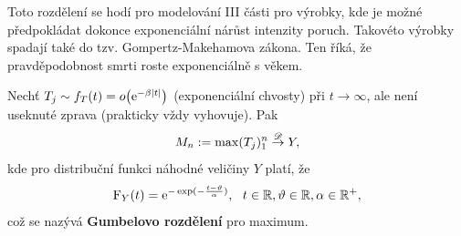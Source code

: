     Toto rozdělení se hodí pro modelování III části pro výrobky, kde je možné předpokládat dokonce exponenciální nárůst intenzity poruch. Takovéto výrobky spadají také do tzv. Gompertz-Makehamova zákona. Ten říká, že pravděpodobnost smrti roste exponenciálně s věkem.

    \begin{define}
        Nechť $T_j \sim f_T(t) = o\big(\mathrm{e}^{-\beta\left|t\right|} \big)$ (exponenciální chvosty) při $t \rightarrow \infty$, ale není useknuté zprava (prakticky vždy vyhovuje). Pak 
        $$ M_n:=\max(T_j)_1^n  \stackrel{\mathscr{D}}{\to} Y  ,$$ kde
        pro distribuční funkci náhodné veličiny $Y$ platí, že	
        $$ \mathrm{F}_Y(t)  = \mathrm{e}^{-\exp(-\frac{t-\vartheta}{\alpha} )},~~t \in \mathbb{R}, \vartheta \in \mathbb{R}, \alpha \in\mathbb{R}^+,  $$
        což se nazývá \textbf{Gumbelovo rozdělení} pro maximum.
    \end{define}
    
